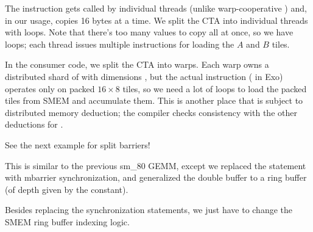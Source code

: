 

\newpage
{}

The  instruction gets called by individual threads (unlike warp-cooperative ) and, in our usage, copies 16 bytes at a time.
We split the CTA into individual threads with  loops.
Note that there's too many values to copy all at once, so we have  loops; each thread issues multiple  instructions for loading the $A$ and $B$ tiles.



\newpage
{}

In the consumer code, we split the CTA into warps.
Each warp owns a distributed shard of  with dimensions \lighttt{[Mw/16, Nw/8, 16, 8]}, but the actual  instruction ( in Exo) operates only on packed $16 \times 8$ tiles, so we need a lot of  loops to load the packed tiles from SMEM and accumulate them.
This is another place that  is subject to distributed memory deduction; the compiler checks consistency with the other deductions for .



See the next example for split barriers!

\newpage
{}

This is similar to the previous sm\_80 GEMM, except we replaced the  statement with mbarrier synchronization, and generalized the double buffer to a ring buffer (of depth given by the  constant).



\newpage
{}

Besides replacing the synchronization statements, we just have to change the SMEM ring buffer indexing logic.


\filbreak



